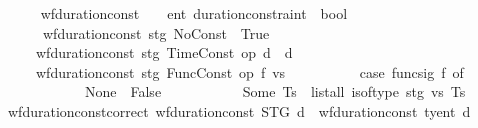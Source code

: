 \begin{isabellebody}
\endisatagproof
{\isafoldproof}%
%
\isadelimproof
\isanewline
%
\endisadelimproof
\isanewline
\ \ \ \ \isamarkupfalse%
\ wf{\isacharunderscore}{\kern0pt}duration{\isacharunderscore}{\kern0pt}const{\isacharprime}{\kern0pt}\ {\isacharcolon}{\kern0pt}{\isacharcolon}{\kern0pt}\ {\isachardoublequoteopen}{\isacharunderscore}{\kern0pt}\ {\isasymRightarrow}\ {\isacharprime}{\kern0pt}ent\ duration{\isacharunderscore}{\kern0pt}constraint\ {\isasymRightarrow}\ bool{\isachardoublequoteclose}\ \isanewline
\ \ \ \ \ \ {\isachardoublequoteopen}wf{\isacharunderscore}{\kern0pt}duration{\isacharunderscore}{\kern0pt}const{\isacharprime}{\kern0pt}\ stg\ No{\isacharunderscore}{\kern0pt}Const\ {\isasymlongleftrightarrow}\ True{\isachardoublequoteclose}\isanewline
\ \ \ \ {\isacharbar}{\kern0pt}\ {\isachardoublequoteopen}wf{\isacharunderscore}{\kern0pt}duration{\isacharunderscore}{\kern0pt}const{\isacharprime}{\kern0pt}\ stg\ {\isacharparenleft}{\kern0pt}Time{\isacharunderscore}{\kern0pt}Const\ op\ d{\isacharparenright}{\kern0pt}\ {\isasymlongleftrightarrow}\ d\ {\isasymge}\ {}{\isachardoublequoteclose}\isanewline
\ \ \ \ {\isacharbar}{\kern0pt}\ {\isachardoublequoteopen}wf{\isacharunderscore}{\kern0pt}duration{\isacharunderscore}{\kern0pt}const{\isacharprime}{\kern0pt}\ stg\ {\isacharparenleft}{\kern0pt}Func{\isacharunderscore}{\kern0pt}Const\ op\ f\ vs{\isacharparenright}{\kern0pt}\ {\isasymlongleftrightarrow}\ \isanewline
\ \ \ \ \ \ \ \ {\isacharparenleft}{\kern0pt}case\ func{\isacharunderscore}{\kern0pt}sig\ f\ of\isanewline
\ \ \ \ \ \ \ \ \ \ \ \ None\ {\isasymRightarrow}\ False\isanewline
\ \ \ \ \ \ \ \ \ \ {\isacharbar}{\kern0pt}\ Some\ Ts\ {\isasymRightarrow}\ list{\isacharunderscore}{\kern0pt}all{}\ {\isacharparenleft}{\kern0pt}is{\isacharunderscore}{\kern0pt}of{\isacharunderscore}{\kern0pt}type{\isacharprime}{\kern0pt}\ stg{\isacharparenright}{\kern0pt}\ vs\ Ts{\isacharparenright}{\kern0pt}{\isachardoublequoteclose}\isanewline
\isanewline
\ \ \ \ \isamarkupfalse%
\ wf{\isacharunderscore}{\kern0pt}duration{\isacharunderscore}{\kern0pt}const{\isacharprime}{\kern0pt}{\isacharunderscore}{\kern0pt}correct{\isacharcolon}{\kern0pt}\ {\isachardoublequoteopen}wf{\isacharunderscore}{\kern0pt}duration{\isacharunderscore}{\kern0pt}const{\isacharprime}{\kern0pt}\ STG\ d\ {\isacharequal}{\kern0pt}\ wf{\isacharunderscore}{\kern0pt}duration{\isacharunderscore}{\kern0pt}const\ ty{\isacharunderscore}{\kern0pt}ent\ d{\isachardoublequoteclose}\isanewline
%
\isadelimproof
\ \ \ \ \ \ %
\endisadelimproof

\end{isabellebody}
